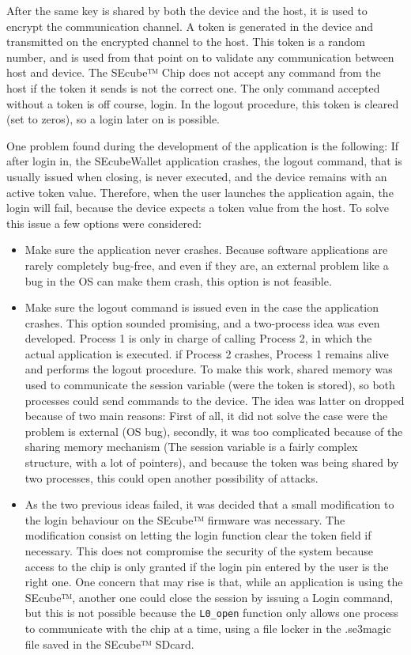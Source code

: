 After the same key is shared by both the device and the host, it is used to encrypt the communication channel. A token is generated in the device and transmitted on the encrypted channel to the host. This token is a random number, and is used from that point on to validate any communication between host and device. The SEcube™ Chip does not accept any command from the host if the token it sends is not the correct one. The only command accepted without a token is off course, login. In the logout procedure, this token is cleared (set to zeros), so a login later on is possible.

One problem found during the development of the application is the following: If after login in, the SEcubeWallet application crashes, the logout command, that is usually issued when closing, is never executed, and the device remains with an active token value. Therefore, when the user launches the application again, the login will fail, because the device expects a token value from the host. To solve this issue a few options were considered:

\begin{itemize}
\setlength\itemsep{-3pt}

\item Make sure the application never crashes. Because software applications are rarely completely bug-free, and even if they are, an external problem like a bug in the OS can make them crash, this option is not feasible. 
\item Make sure the logout command is issued even in the case the application crashes. This option sounded promising, and a two-process idea was even developed. Process 1 is only in charge of calling Process 2, in which the actual application is executed. if Process 2 crashes, Process 1 remains alive and performs the logout procedure. To make this work, shared memory was used to communicate the session variable (were the token is stored), so both processes could send commands to the device. The idea was latter on dropped because of two main reasons: First of all, it did not solve the case were the problem is external (OS bug), secondly, it was too complicated because of the sharing memory mechanism (The session variable is a fairly complex structure, with a lot of pointers), and because the token was being shared by two processes, this could open another possibility of attacks.
\item As the two previous ideas failed, it was decided that a small modification to the login behaviour on the SEcube™ firmware was necessary. The modification consist on letting the login function clear the token field if necessary. This does not compromise the security of the system because access to the chip is only granted if the login pin entered by the user is the right one. One concern that may rise is that, while an application is using the SEcube™, another one could close the session by issuing a Login command, but this is not possible because the \texttt{L0\_open} function only allows one process to communicate with the chip at a time, using a file locker in the .se3magic
file saved in the SEcube™ SDcard.
\end{itemize} 

